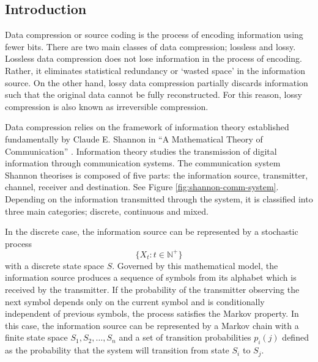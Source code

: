 \subsection{Introduction}

Data compression or source coding is the process of encoding information using fewer bits. There are two main classes of data compression; lossless and lossy. Lossless data compression does not lose information in the process of encoding. Rather, it eliminates statistical redundancy or `wasted space' in the information source. On the other hand, lossy data compression partially discards information such that the original data cannot be fully reconstructed. For this reason, lossy compression is also known as irreversible compression.


%


Data compression relies on the framework of information theory established fundamentally by Claude E. Shannon in ``A Mathematical Theory of Communication'' \cite{shannon}. Information theory studies the transmission of digital information through communication systems. The communication system Shannon theorises is composed of five parts: the information source, transmitter, channel, receiver and destination. See Figure \ref{fig:shannon-comm-system}. Depending on the information transmitted through the system, it is classified into three main categories; discrete, continuous and mixed.



In the discrete case, the information source can be represented by a stochastic process \[\{X_t: t\in\mathbb{N}^+\}\] with a discrete state space $S$. Governed by this mathematical model, the information source produces a sequence of symbols from its alphabet which is received by the transmitter. If the probability of the transmitter observing the next symbol depends only on the current symbol and is conditionally independent of previous symbols, the process satisfies the Markov property. In this case, the information source can be represented by a Markov chain with a finite state space $S_1,S_2,\dots,S_n$ and a set of transition probabilities $p_i(j)$ defined as the probability that the system will transition from state $S_i$ to $S_j$.

